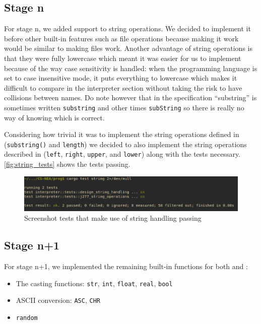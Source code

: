 \documentclass{article}
\begin{document}
\subsection{Stage n}

For stage n, we added support to string operations. We decided to implement it
before other built-in features such as file operations because making it work
would be similar to making files work. Another advantage of string operations
is that they were fully lowercase which meant it was easier for us to implement
because of the way case sensitivity is handled: when the programming language
is set to case insensitive mode, it puts everything to lowercase which makes it
difficult to compare in the interpreter section without taking the risk to have
collisions between names. Do note however that in the specification
``substring'' is sometimes written \texttt{substring} and other times
\texttt{subString} so there is really no way of knowing which is correct.

Considering how trivial it was to implement the string operations defined in
 (\texttt{substring()} and \texttt{length}) we decided to also
implement the string operations described in  (\texttt{left},
\texttt{right}, \texttt{upper}, and \texttt{lower}) along with the tests
necessary. \autoref{fig:string_tests} shows the tests passing.

\begin{figure}
	\includegraphics[width=\textwidth]{string_tests}
	\caption{Screenshot tests that make use of string handling passing}
	\label{fig:string_tests}
\end{figure}

\subsection{Stage n+1}

For stage n+1, we implemented the remaining built-in functions for both
 and :

\begin{itemize}
	\item The casting functions: \texttt{str}, \texttt{int}, \texttt{float},
		\texttt{real}, \texttt{bool}
	\item ASCII conversion: \texttt{ASC}, \texttt{CHR}
	\item \texttt{random}
\end{itemize}
\end{document}
